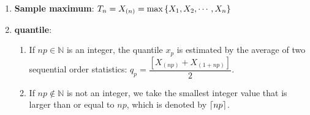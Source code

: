 \begin{enumerate}
    \item \textbf{Sample maximum}: $T_n = X_{(n)} = \max \left\{X_1, X_2, \cdots, X _n \right\}$
    \hfill \cite{statistics/book/Statistics-for-Data-Scientists/Maurits-Kaptein}

    \item \textbf{quantile}:
    \begin{enumerate}
        \item If $np \in \mathbb{N}$ is an integer, the quantile $x _p$ is estimated by the average of two sequential order statistics: $q _p = \dfrac{[X_{(np)} + X_{(1+np)}]}{2}$.
        \hfill \cite{statistics/book/Statistics-for-Data-Scientists/Maurits-Kaptein}

        \item If $np \notin \mathbb{N}$ is not an integer, we take the smallest integer value that is larger than or equal to $np$, which is denoted by $\left \lceil np \right \rceil$.
        \hfill \cite{statistics/book/Statistics-for-Data-Scientists/Maurits-Kaptein}
    \end{enumerate}
\end{enumerate}


